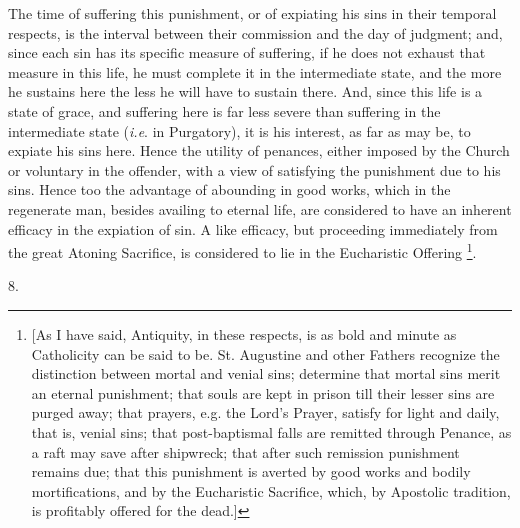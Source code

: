 The time of suffering this punishment, or of expiating his sins in
their temporal respects, is the interval between their commission and
the day of judgment; and, since each sin has its specific measure of
suffering, if he does not exhaust that measure in this life, he must
complete it in the intermediate state, and the more he sustains here
the less he will have to sustain there. And, since this life is a
state of grace, and suffering here is far less severe than suffering
in the intermediate state (\emph{i.e}. in Purgatory), it is his
interest, as far as may be, to expiate his sins here. Hence the
utility of penances, either imposed by the Church or voluntary in the
offender, with a view of satisfying the punishment due to his sins.
Hence too the advantage of abounding in good works, which in the
regenerate man, besides availing to eternal life, are considered to
have an inherent efficacy in the expiation of sin. A like efficacy,
but proceeding immediately from the great Atoning Sacrifice, is
considered to lie in the Eucharistic Offering \footnote{[As I have said, Antiquity, in these
respects, is as bold and minute as Catholicity can be said to be. St.
Augustine and other Fathers recognize the distinction between mortal
and venial sins; determine that mortal sins merit an eternal
punishment; that souls are kept in prison till their lesser sins are
purged away; that prayers, e.g. the Lord's Prayer, satisfy for light
and daily, that is, venial sins; that post-baptismal falls are
remitted through Penance, as a raft may save after shipwreck; that
after such remission punishment remains due; that this punishment is
averted by good works and bodily mortifications, and by the
Eucharistic Sacrifice, which, by Apostolic tradition, is profitably
offered for the dead.]}.

8.

